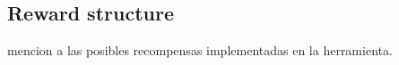


\subsection{Reward structure}
mencion a las posibles recompensas implementadas en la herramienta.


